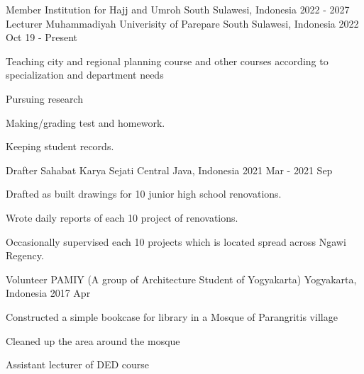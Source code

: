 

\begin{cventries}
	\cventry
	{Member} %
	{Institution for Hajj and Umroh} %
	{South Sulawesi, Indonesia} %
	{2022 - 2027} %
	{}
	\cventry
	{Lecturer} %
	{Muhammadiyah Univerisity of Parepare} %
	{South Sulawesi, Indonesia} %
	{2022 Oct 19  - Present} %
	{
		\begin{cvitems} %
			\item{Teaching city and regional planning course and other courses according to specialization and department needs}
			\item{Pursuing research}
			\item {Making/grading test and homework.}
			\item{Keeping student records.}
		\end{cvitems}
	}
	\cventry
	{Drafter} %
	{Sahabat Karya Sejati} %
	{Central Java, Indonesia} %
	{2021 Mar - 2021 Sep} %
	{
		\begin{cvitems} %
			\item {Drafted as built drawings for 10 junior high school renovations.}
			\item{Wrote daily reports of each 10 project of renovations.}
			\item{Occasionally supervised each 10 projects which is located spread across Ngawi Regency.}
		\end{cvitems}
	}
	\cventry
	{Volunteer} %
	{PAMIY (A group of Architecture Student of Yogyakarta)} %
	{Yogyakarta, Indonesia} %
	{2017 Apr} %
	{
		\begin{cvitems} %
			\item {Constructed a simple bookcase for library in a Mosque of Parangritis village }
			\item{Cleaned up the area around the mosque}
		\end{cvitems}
	}
	\cventry
	{Assistant lecturer of DED course} %

\end{cventries}
